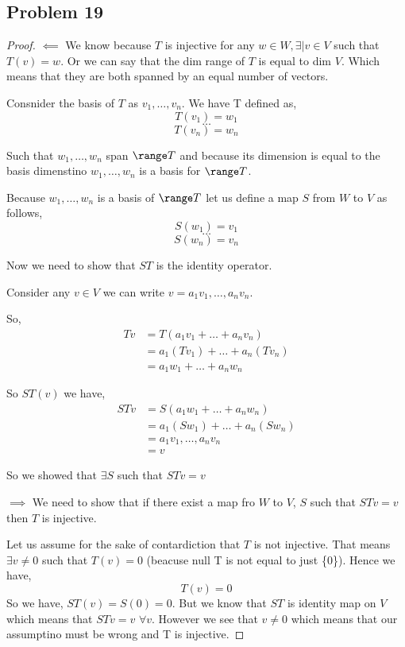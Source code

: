 \documentclass[a4paper]{report}
\begin{document}
\subsection*{Problem 19}
\begin{proof}
    $\impliedby$
    We know because $T$ is injective for any $w \in W, \exists | v \in V$  such that $T(v) = w$. Or we can say that the dim range of $T$ is equal to dim $V$. Which means that they are both spanned by an equal number of vectors.

    Consnider the basis of $T$ as $v_1,\dots,v_n$. We have T defined as,
    $$ T(v_1) = w_1 $$ 
    $$ \dots $$ 
    $$ T(v_n) = w_n $$ 

    Such that $w_1,\dots,w_n$ span $\range T$ and because its dimension is equal to the basis dimenstino $w_1,\dots,w_n$ is a basis for $\range T$.

    Because $w_1,\dots,w_n$ is a basis of $\range T$ let us define a map $S$ from $W$ to $V$ as follows, 
    $$ S(w_1) = v_1 $$ 
    $$ \dots $$ 
    $$ S(w_n) = v_n $$ 

    Now we need to show that $ST$ is the identity operator. 

    Consider any $v \in V$ we can write $v = a_1v_1,\dots,a_nv_n$.

    So, 
     \begin{align*}
         Tv &= T(a_1v_1+\dots+a_nv_n)\\
        &= a_1(Tv_1)+ \dots+ a_n(Tv_n)\\
        &= a_1w_1+\dots+a_nw_n
    \end{align*}

    So $ST(v)$ we have, 
    \begin{align*}
        STv &= S(a_1w_1+\dots+a_nw_n)\\
        &= a_1(Sw_1) + \dots + a_n(Sw_n)\\
        &= a_1v_1,\dots,a_nv_n\\
        &= v
    \end{align*}

    So we showed that $\exists S$ such that $STv =  v$

    $\implies$ 
    We need to show that if there exist a map fro $W$ to $V$, $S$ such that $STv = v$ then $T$ is injective.

    Let us assume for the sake of contardiction that $T$ is not injective. That means $\exists v \ne 0$  such that $T(v) = 0$ (beacuse null T is not equal to just \{0\}). Hence we have, 
    $$ T(v) = 0 $$
    So we have, $ST(v) = S(0) = 0$. But we know that $ST$ is identity map on $ V$ which means that $STv = v$ $\forall v$. However we see that $v \ne 0$ which means that our assumptino must be wrong and T is injective.

\end{proof}
\end{document}

